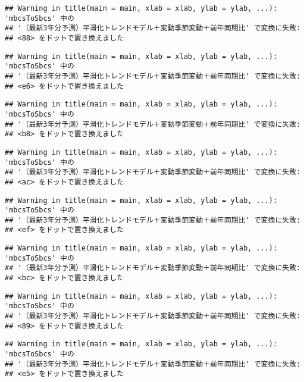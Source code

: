\documentclass[]{article}
\begin{document}
\begin{verbatim}
## Warning in title(main = main, xlab = xlab, ylab = ylab, ...): 'mbcsToSbcs' 中の
## '（最新3年分予測）平滑化トレンドモデル＋変動季節変動＋前年同期比' で変換に失敗:
## <88> をドットで置き換えました
\end{verbatim}

\begin{verbatim}
## Warning in title(main = main, xlab = xlab, ylab = ylab, ...): 'mbcsToSbcs' 中の
## '（最新3年分予測）平滑化トレンドモデル＋変動季節変動＋前年同期比' で変換に失敗:
## <e6> をドットで置き換えました
\end{verbatim}

\begin{verbatim}
## Warning in title(main = main, xlab = xlab, ylab = ylab, ...): 'mbcsToSbcs' 中の
## '（最新3年分予測）平滑化トレンドモデル＋変動季節変動＋前年同期比' で変換に失敗:
## <b8> をドットで置き換えました
\end{verbatim}

\begin{verbatim}
## Warning in title(main = main, xlab = xlab, ylab = ylab, ...): 'mbcsToSbcs' 中の
## '（最新3年分予測）平滑化トレンドモデル＋変動季節変動＋前年同期比' で変換に失敗:
## <ac> をドットで置き換えました
\end{verbatim}

\begin{verbatim}
## Warning in title(main = main, xlab = xlab, ylab = ylab, ...): 'mbcsToSbcs' 中の
## '（最新3年分予測）平滑化トレンドモデル＋変動季節変動＋前年同期比' で変換に失敗:
## <ef> をドットで置き換えました
\end{verbatim}

\begin{verbatim}
## Warning in title(main = main, xlab = xlab, ylab = ylab, ...): 'mbcsToSbcs' 中の
## '（最新3年分予測）平滑化トレンドモデル＋変動季節変動＋前年同期比' で変換に失敗:
## <bc> をドットで置き換えました
\end{verbatim}

\begin{verbatim}
## Warning in title(main = main, xlab = xlab, ylab = ylab, ...): 'mbcsToSbcs' 中の
## '（最新3年分予測）平滑化トレンドモデル＋変動季節変動＋前年同期比' で変換に失敗:
## <89> をドットで置き換えました
\end{verbatim}

\begin{verbatim}
## Warning in title(main = main, xlab = xlab, ylab = ylab, ...): 'mbcsToSbcs' 中の
## '（最新3年分予測）平滑化トレンドモデル＋変動季節変動＋前年同期比' で変換に失敗:
## <e5> をドットで置き換えました
\end{verbatim}
\end{document}
